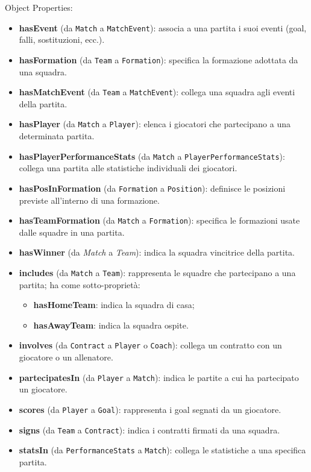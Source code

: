 \documentclass[11pt]{report} %
\begin{document}
Object Properties:
\begin{itemize}
    \item \textbf{hasEvent} (da \texttt{Match} a \texttt{MatchEvent}): associa a una partita i suoi eventi (goal, falli, sostituzioni, ecc.).
    \item \textbf{hasFormation} (da \texttt{Team} a \texttt{Formation}): specifica la formazione adottata da una squadra.
    \item \textbf{hasMatchEvent} (da \texttt{Team} a \texttt{MatchEvent}): collega una squadra agli eventi della partita.
    \item \textbf{hasPlayer} (da \texttt{Match} a \texttt{Player}): elenca i giocatori che partecipano a una determinata partita.
    \item \textbf{hasPlayerPerformanceStats} (da \texttt{Match} a \texttt{PlayerPerformanceStats}): collega una partita alle statistiche individuali dei giocatori.
    \item \textbf{hasPosInFormation} (da \texttt{Formation} a \texttt{Position}): definisce le posizioni previste all'interno di una formazione.
    \item \textbf{hasTeamFormation} (da \texttt{Match} a \texttt{Formation}): specifica le formazioni usate dalle squadre in una partita.
    \item \textbf{hasWinner} (da \textit{Match} a \textit{Team}): indica la squadra vincitrice della partita.
    \item \textbf{includes} (da \texttt{Match} a \texttt{Team}): rappresenta le squadre che partecipano a una partita; ha come sotto-proprietà:
    
    \begin{itemize}
        \item \textbf{hasHomeTeam}: indica la squadra di casa;
        \item \textbf{hasAwayTeam}: indica la squadra ospite.
    \end{itemize}

    \item \textbf{involves} (da \texttt{Contract} a \texttt{Player} o \texttt{Coach}): collega un contratto con un giocatore o un allenatore.
    \item \textbf{partecipatesIn} (da \texttt{Player} a \texttt{Match}): indica le partite a cui ha partecipato un giocatore.
    \item \textbf{scores} (da \texttt{Player} a \texttt{Goal}): rappresenta i goal segnati da un giocatore.
    \item \textbf{signs} (da \texttt{Team} a \texttt{Contract}): indica i contratti firmati da una squadra.
    \item \textbf{statsIn} (da \texttt{PerformanceStats} a \texttt{Match}): collega le statistiche a una specifica partita.
\end{itemize}
\end{document}
